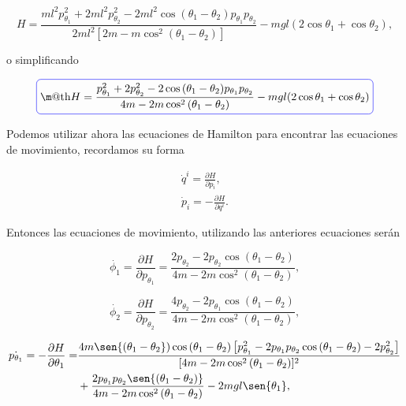 \documentclass[a4paper,10pt]{article}
\makeatletter
\numberwithin{equation}{section}
\newcommand*{\boxcolor}{blue}
\renewcommand{\boxed}[1]{\textcolor{\boxcolor}{%
\tikz[baseline={([yshift=-1ex]current bounding box.center)}] \node [rectangle, minimum width=1ex,rounded corners,draw] {\normalcolor\m@th$\displaystyle#1$};}}
\makeatother
\begin{document}
\begin{equation}
 H = \frac{ml^2p_{\theta_1}^2 + 2ml^2p_{\theta_2}^2 - 
 2ml^2\cos{(\theta_1 - \theta_2)p_{\theta_1}p_{\theta_2}}}{2ml^2[2m - 
 m\cos^2{(\theta_1 - \theta_2)}]} - mgl(2\cos{\theta_1} + \cos{\theta_2}),
\end{equation}

o simplificando 

\begin{equation}
 \boxed{H = \frac{p_{\theta_1}^2 + 2p_{\theta_2}^2 - 
 2\cos{(\theta_1 - \theta_2)p_{\theta_1}p_{\theta_2}}}{4m - 
 2m\cos^2{(\theta_1 - \theta_2)}} - mgl(2\cos{\theta_1} + \cos{\theta_2})}
\end{equation}

Podemos utilizar ahora las ecuaciones de Hamilton para encontrar las ecuaciones de 
movimiento, recordamos su forma

\begin{align}
 \dot{q}^i = \frac{\partial H}{\partial p_i}, \\
 \dot{p}_i = - \frac{\partial H}{\partial q^i}.
\end{align}

Entonces las ecuaciones de movimiento, utilizando las anteriores ecuaciones serán

\begin{equation}
 \dot{\phi_1} =  \frac{\partial H}{\partial p_{\theta_1}} = 
 \frac{2p_{\theta_2} - 2p_{\theta_2}\cos{(\theta_1 - \theta_2)}}{4m - 
 2m\cos^2{(\theta_1 - \theta_2)}},
\end{equation}

\begin{equation}
 \dot{\phi_2} =  \frac{\partial H}{\partial p_{\theta_2}} = 
 \frac{4p_{\theta_2} - 2p_{\theta_1}\cos{(\theta_1 - \theta_2)}}{4m - 
 2m\cos^2{(\theta_1 - \theta_2)}},
\end{equation}

\begin{align}
\begin{split}
 \dot{p_{\theta_1}} = - \frac{\partial H}{\partial \theta_1} = 
 &\frac{4m\sen{(\theta_1 - \theta_2})\cos{(\theta_1 - \theta_2)}
 \left[p_{\theta_1}^2 - 2p_{\theta_1}p_{\theta_2}\cos{(\theta_1 - \theta_2)} - 2p_{\theta_2}^2\right]}{[4m - 2m\cos^2{(\theta_1 - \theta_2)}]^2} \\
 &+ \frac{2p_{\theta_1}p_{\theta_2}\sen{(\theta_1 - \theta_2)}}{4m - 2m\cos^2{(\theta_1 - \theta_2)}} 
 - 2mgl\sen{\theta_1},
\end{split}
\end{align}
\end{document}

